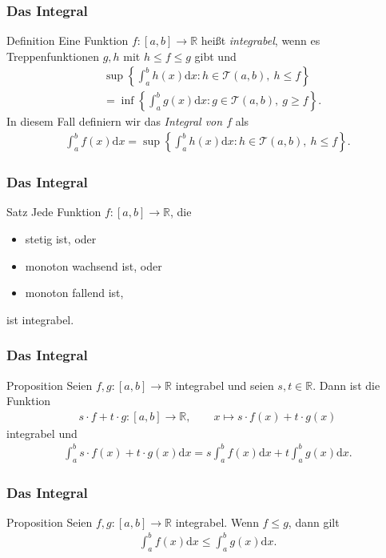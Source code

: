 \documentclass{beamer}
\renewcommand{\emph}[1]{{\textcolor{solarizedRed}{\itshape #1}}}
\newcommand\dd{\mathrm d}
\newcommand\cT{\mathcal T}
\newcommand\RR{\mathbb R}
\newcommand\cbc[1]{\left\{{#1}\right\}}
\newcommand{\mytitle}{Das Integral}
\begin{document}
\begin{frame}\frametitle{\mytitle}
	\begin{block}{Definition}
		Eine Funktion $f:[a,b]\to\RR$ hei\ss t \emph{integrabel}, wenn es Treppenfunktionen $g,h$ mit
		$ h\leq f\leq g $ gibt und
		\begin{align*}
			&\sup\cbc{\int_a^bh(x)\dd x:h\in\cT(a,b),\ h\leq f}\\&=\inf\cbc{\int_a^bg(x)\dd x:g\in\cT(a,b),\ g\geq f}.
		\end{align*}
		In diesem Fall definiern wir das \emph{Integral von $f$} als
		\begin{align*}
			\int_a^bf(x)\dd x=\sup\cbc{\int_a^bh(x)\dd x:h\in\cT(a,b),\ h\leq f}.
		\end{align*}
	\end{block}
\end{frame}

\begin{frame}\frametitle{\mytitle}
	\begin{block}{Satz}
		Jede Funktion $f:[a,b]\to\RR$, die
	\begin{itemize}
		\item stetig ist, oder
		\item monoton wachsend ist, oder
		\item monoton fallend ist, 
	\end{itemize}
	ist integrabel.
	\end{block}
\end{frame}

\begin{frame}\frametitle{\mytitle}
	\begin{block}{Proposition}
		Seien $f,g:[a,b]\to\RR$ integrabel und seien $s,t\in\RR$.
		Dann ist die Funktion
		\begin{align*}
			s\cdot f+t\cdot g:[a,b]\to\RR,\qquad x\mapsto s\cdot f(x)+t\cdot g(x)
		\end{align*}
		integrabel und
		\begin{align*}
			\int_a^b s\cdot f(x)+t\cdot g(x)\dd x=s\int_a^b f(x)\dd x+t\int_a^bg(x)\dd x.
		\end{align*}
	\end{block}
\end{frame}

\begin{frame}\frametitle{\mytitle}
	\begin{block}{Proposition}
		Seien $f,g:[a,b]\to\RR$ integrabel.
		Wenn $f\leq g$, dann gilt
		\begin{align*}
			\int_a^bf(x)\dd x\leq\int_a^bg(x)\dd x.
		\end{align*}
	\end{block}
\end{frame}
\end{document}
